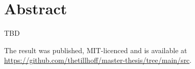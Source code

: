 \titlespacing*{\chapter}{170pt}{0pt}{10pt} %

\chapter*{Abstract}
\begin{addmargin}[2em]{2em}
TBD
\end{addmargin}

\bigskip
\begin{addmargin}[2em]{2em}
The result was published, MIT-licenced and is available at \url{https://github.com/thetillhoff/master-thesis/tree/main/src}.
\end{addmargin}


\titlespacing*{\chapter}{0pt}{0pt}{10pt} %
